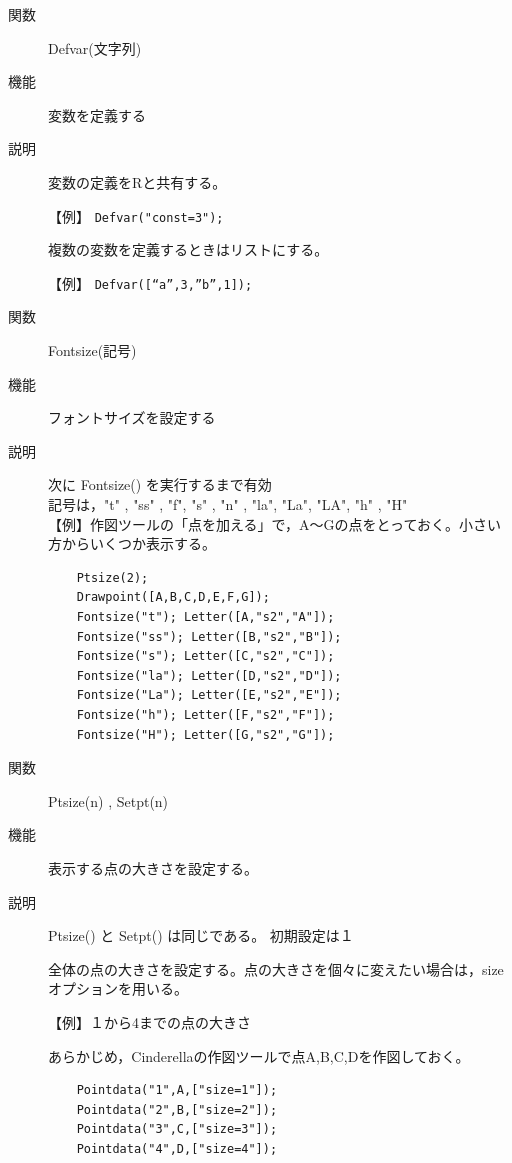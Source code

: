 \documentclass[papersize,a4paper,12pt,uplatex]{jsarticle}
\begin{document}
\begin{description}
\vspace{\baselineskip}
\hypertarget{defvar}{}
\item[関数]  Defvar(文字列)
\item[機能]  変数を定義する
\item[説明]  変数の定義をRと共有する。

【例】  \verb|Defvar("const=3");|

\vspace{\baselineskip}
  複数の変数を定義するときはリストにする。
  
【例】  \verb|Defvar([“a”,3,”b”,1]);|

\vspace{\baselineskip}
\hypertarget{fontsize}{}
\item[関数]  Fontsize(記号)
\item[機能]  フォントサイズを設定する
\item[説明]  次に Fontsize() を実行するまで有効\\
  記号は，"t" , "ss" , "f", "s" , "n" , "la",  "La", "LA", "h" , "H"\\

【例】作図ツールの「点を加える」で，A〜Gの点をとっておく。小さい方からいくつか表示する。
\begin{verbatim}
    Ptsize(2);
    Drawpoint([A,B,C,D,E,F,G]);
    Fontsize("t"); Letter([A,"s2","A"]);
    Fontsize("ss"); Letter([B,"s2","B"]);
    Fontsize("s"); Letter([C,"s2","C"]);
    Fontsize("la"); Letter([D,"s2","D"]);
    Fontsize("La"); Letter([E,"s2","E"]);
    Fontsize("h"); Letter([F,"s2","F"]);
    Fontsize("H"); Letter([G,"s2","G"]);
\end{verbatim}


\vspace{\baselineskip}
\hypertarget{setpt}{}
\hypertarget{ptsize}{}
\item[関数]  Ptsize(n) , Setpt(n)
\item[機能]  表示する点の大きさを設定する。
\item[説明]  Ptsize() と Setpt() は同じである。 初期設定は１

全体の点の大きさを設定する。点の大きさを個々に変えたい場合は，sizeオプションを用いる。

\vspace{\baselineskip}
【例】１から4までの点の大きさ

あらかじめ，Cinderellaの作図ツールで点A,B,C,Dを作図しておく。
\begin{verbatim}
    Pointdata("1",A,["size=1"]);
    Pointdata("2",B,["size=2"]);
    Pointdata("3",C,["size=3"]);
    Pointdata("4",D,["size=4"]);
\end{verbatim}
\hspace{10mm}


\end{description}
\end{document}
